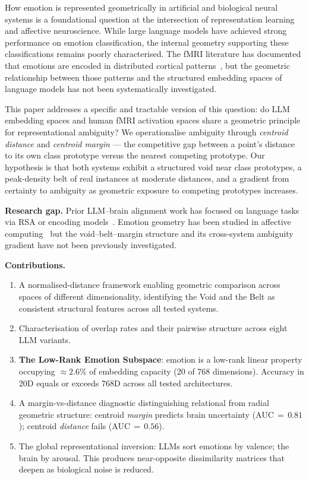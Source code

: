 \documentclass{article}
\begin{document}
How emotion is represented geometrically in artificial and biological neural systems is
a foundational question at the intersection of representation learning and affective
neuroscience. While large language models have achieved strong performance on emotion
classification, the internal geometry supporting these classifications remains poorly
characterised. The fMRI literature has documented that emotions are encoded in
distributed cortical patterns~\citep{horikawa2020}, but the geometric relationship
between those patterns and the structured embedding spaces of language models has not
been systematically investigated.

This paper addresses a specific and tractable version of this question: do LLM embedding
spaces and human fMRI activation spaces share a geometric principle for representational
ambiguity? We operationalise ambiguity through \emph{centroid distance} and
\emph{centroid margin} --- the competitive gap between a point's distance to its own class
prototype versus the nearest competing prototype. Our hypothesis is that both systems
exhibit a structured void near class prototypes, a peak-density belt of real instances
at moderate distances, and a gradient from certainty to ambiguity as geometric exposure
to competing prototypes increases.

\textbf{Research gap.}
Prior LLM--brain alignment work has focused on language tasks via RSA or encoding
models~\citep{caucheteux2022,schrimpf2021,li2023b,huth2016,li2023a}.
Emotion geometry has been studied in affective computing~\citep{russell1980,koelstra2012}
but the void--belt--margin structure and its cross-system ambiguity gradient have not
been previously investigated.

\textbf{Contributions.}
\begin{enumerate}
  \item A normalised-distance framework enabling geometric comparison across spaces of
        different dimensionality, identifying the Void and the Belt as consistent
        structural features across all tested systems.
  \item Characterisation of overlap rates and their pairwise structure across eight
        LLM variants.
  \item \textbf{The Low-Rank Emotion Subspace}: emotion is a low-rank linear property
        occupying $\approx\!2.6\%$ of embedding capacity (20 of 768 dimensions).
        Accuracy in 20D equals or exceeds 768D across all tested architectures.
  \item A margin-vs-distance diagnostic distinguishing relational from radial geometric
        structure: centroid \emph{margin} predicts brain uncertainty
        (AUC$\,{=}\,0.81$); centroid \emph{distance} fails (AUC$\,{=}\,0.56$).
  \item The global representational inversion: LLMs sort emotions by valence; the brain
        by arousal. This produces near-opposite dissimilarity matrices that deepen as
        biological noise is reduced.
\end{enumerate}
\end{document}
